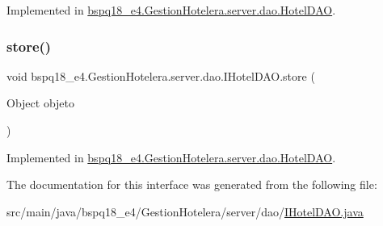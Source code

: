 Implemented in \mbox{\hyperlink{classbspq18__e4_1_1_gestion_hotelera_1_1server_1_1dao_1_1_hotel_d_a_o_ac86f3620a6def683599bbbd8d479ac5c}{bspq18\+\_\+e4.\+Gestion\+Hotelera.\+server.\+dao.\+Hotel\+D\+AO}}.

\mbox{\label{interfacebspq18__e4_1_1_gestion_hotelera_1_1server_1_1dao_1_1_i_hotel_d_a_o_a4e3c6763bb643d660babac78c6e29559}} 
\subsubsection{\texorpdfstring{store()}{store()}}
{\footnotesize\ttfamily void bspq18\+\_\+e4.\+Gestion\+Hotelera.\+server.\+dao.\+I\+Hotel\+D\+A\+O.\+store (\begin{DoxyParamCaption}\item[{Object}]{objeto }\end{DoxyParamCaption})}



Implemented in \mbox{\hyperlink{classbspq18__e4_1_1_gestion_hotelera_1_1server_1_1dao_1_1_hotel_d_a_o_a85ecdd997c17390a28b8132f15ad431c}{bspq18\+\_\+e4.\+Gestion\+Hotelera.\+server.\+dao.\+Hotel\+D\+AO}}.



The documentation for this interface was generated from the following file\+:\begin{DoxyCompactItemize}
\item 
src/main/java/bspq18\+\_\+e4/\+Gestion\+Hotelera/server/dao/\mbox{\hyperlink{_i_hotel_d_a_o_8java}{I\+Hotel\+D\+A\+O.\+java}}\end{DoxyCompactItemize}
